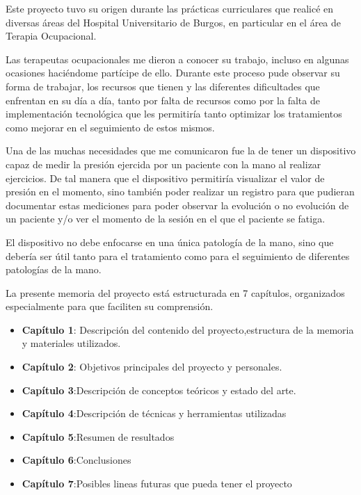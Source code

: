 Este proyecto tuvo su origen durante las prácticas curriculares que realicé en diversas áreas del Hospital Universitario de Burgos, en particular en el área de Terapia Ocupacional. 

Las terapeutas ocupacionales me dieron a conocer su trabajo, incluso en algunas ocasiones haciéndome partícipe de ello. Durante este proceso pude observar su forma de trabajar, los recursos que tienen y las diferentes dificultades que enfrentan en su día a día, tanto por falta de recursos como por la falta de implementación tecnológica que les permitiría tanto optimizar los tratamientos como mejorar en el seguimiento de estos mismos.

Una de las muchas necesidades que me comunicaron fue la de tener un dispositivo capaz de medir la presión ejercida por un paciente con la mano al realizar ejercicios. De tal manera que el dispositivo permitiría visualizar el valor de presión en el momento, sino también poder realizar un registro para que pudieran documentar estas mediciones para poder observar la evolución o no evolución de un paciente y/o ver el momento de la sesión en el que el paciente se fatiga.

El dispositivo no debe enfocarse en una única patología de la mano, sino que debería ser útil tanto para el tratamiento como para el seguimiento de diferentes patologías de la mano.

La presente memoria del proyecto está estructurada en 7 capítulos, organizados especialmente para que faciliten su comprensión.
\begin{itemize}
    \item \textbf{Capítulo 1}: Descripción del contenido del proyecto,estructura de la memoria y materiales utilizados.
    \item \textbf{Capítulo 2}: Objetivos principales del proyecto y personales.
    \item \textbf{Capítulo 3}:Descripción de conceptos teóricos y estado del arte.
    \item \textbf{Capítulo 4}:Descripción de técnicas y herramientas utilizadas
    \item \textbf{Capítulo 5}:Resumen de resultados 
    \item \textbf{Capítulo 6}:Conclusiones 
    \item \textbf{Capítulo 7}:Posibles lineas futuras que pueda tener el proyecto
\end{itemize}
